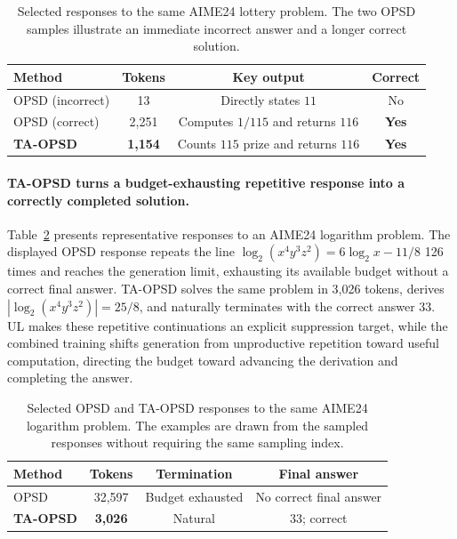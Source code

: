 \documentclass{article} %
\begin{document}
\begin{table}[t]
\centering
\caption{Selected responses to the same AIME24 lottery problem. The two OPSD samples illustrate an immediate incorrect answer and a longer correct solution.}
\label{tab:app-short-example}
\setlength{\tabcolsep}{6pt}
\begin{tabular}{lccc}
\toprule
Method & Tokens & Key output & Correct \\
\midrule
OPSD (incorrect) & 13 & Directly states $\boxed{11}$ & No \\
OPSD (correct) & 2,251 & Computes $1/115$ and returns $\boxed{116}$ & \textbf{Yes} \\
\textbf{TA-OPSD} & \textbf{1,154} & Counts $115$ prize and returns $\boxed{116}$ & \textbf{Yes} \\
\bottomrule
\end{tabular}
\end{table}

\paragraph{TA-OPSD turns a budget-exhausting repetitive response into a correctly completed solution.} Table~\ref{tab:app-loop-example} presents representative responses to an AIME24 logarithm problem. The displayed OPSD response repeats the line $\log_2(x^4y^3z^2)=6\log_2x-11/8$ 126 times and reaches the generation limit, exhausting its available budget without a correct final answer. TA-OPSD solves the same problem in 3,026 tokens, derives $|\log_2(x^4y^3z^2)|=25/8$, and naturally terminates with the correct answer $33$. UL makes these repetitive continuations an explicit suppression target, while the combined training shifts generation from unproductive repetition toward useful computation, directing the budget toward advancing the derivation and completing the answer.

\begin{table}[t]
\centering
\caption{Selected OPSD and TA-OPSD responses to the same AIME24 logarithm problem. The examples are drawn from the sampled responses without requiring the same sampling index.}
\label{tab:app-loop-example}
\setlength{\tabcolsep}{6pt}
\renewcommand{\arraystretch}{1.15}
\begin{tabular}{lccc}
\toprule
Method & Tokens & Termination & Final answer \\
\midrule
OPSD & 32,597 & Budget exhausted & No correct final answer \\
\textbf{TA-OPSD} & \textbf{3,026} & Natural & $\boxed{33}$; correct \\
\bottomrule
\end{tabular}
\end{table}
\end{document}
